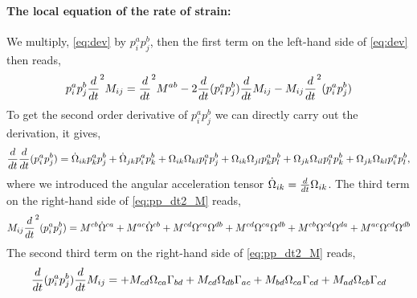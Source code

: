 \paragraph*{The local equation of the rate of strain:}
We multiply, \ref{eq:dev} by $p_i^ap_j^b$, then the first term on the left-hand side of \ref{eq:dev} then reads, 
\begin{align}
    p_i^ap_j^b\frac{d}{dt}^2 M_{ij}
    = 
    \frac{d}{dt}^2 M^{ab}
    - 2 \frac{d}{dt} (p_i^ap_j^b) \frac{d}{dt} M_{ij}
    - M_{ij} \frac{d}{dt}^2 (p_i^ap_j^b)
    \label{eq:pp_dt2_M}
\end{align}
To get the second order derivative of $p_i^ap_j^b$ we can directly carry out the derivation, it gives, 
\begin{align*}
    \frac{d}{dt}\frac{d}{dt}(p_i^ap_j^b)
    = 
    \dot{\Omega}_{ik} p_k^ap_j^b
    + \dot{\Omega}_{jk} p_i^ap_k^b
    + \Omega_{ik}\Omega_{kl} p_l^ap_j^b
    + \Omega_{ik}\Omega_{jl} p_k^ap_l^b
    + \Omega_{jk}\Omega_{il} p_l^ap_k^b
    + \Omega_{jk}\Omega_{kl} p_i^ap_l^b,
\end{align*}
where we introduced the angular acceleration tensor $\dot{\Omega}_{ik} = \frac{d}{dt} \Omega_{ik}$. 
The third term on the right-hand side of \ref{eq:pp_dt2_M} reads, 
\begin{align*}
    M_{ij} \frac{d}{dt}^2 (p_i^ap_j^b)
    = M^{cb} \dot{\Omega}^{ca}
    + M^{ac} \dot{\Omega}^{cb}
    + M^{cd} \Omega^{ca}\Omega^{db}
    + M^{cd} \Omega^{ca}\Omega^{db}
    + M^{cb} \Omega^{cd}\Omega^{da} 
    + M^{ac} \Omega^{cd}\Omega^{db} 
\end{align*}
The second third term on the right-hand side of \ref{eq:pp_dt2_M} reads, 
\begin{align*}
    \frac{d}{dt} (p_i^ap_j^b) \frac{d}{dt} M_{ij}
    = 
    + M_{cd}\Omega_{ca} \Gamma_{bd}   
    + M_{cd}\Omega_{db} \Gamma_{ac}   
    + M_{bd}\Omega_{ca} \Gamma_{cd}  
    + M_{ad}\Omega_{cb}  \Gamma_{cd} 
\end{align*}
